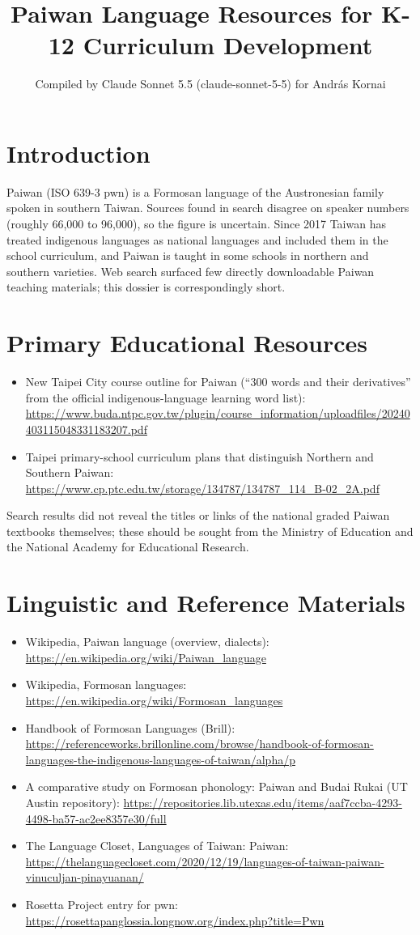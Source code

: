 \documentclass[12pt]{article}
\title{Paiwan Language Resources for K-12 Curriculum Development}
\author{Compiled by Claude Sonnet 5.5 (claude-sonnet-5-5) for Andr\'as Kornai}
\date{}
\begin{document}
\maketitle

\section{Introduction}
Paiwan (ISO 639-3 pwn) is a Formosan language of the Austronesian family spoken in southern Taiwan. Sources found in search disagree on speaker numbers (roughly 66,000 to 96,000), so the figure is uncertain. Since 2017 Taiwan has treated indigenous languages as national languages and included them in the school curriculum, and Paiwan is taught in some schools in northern and southern varieties. Web search surfaced few directly downloadable Paiwan teaching materials; this dossier is correspondingly short.

\section{Primary Educational Resources}
\begin{itemize}
\item New Taipei City course outline for Paiwan (``300 words and their derivatives'' from the official indigenous-language learning word list): \url{https://www.buda.ntpc.gov.tw/plugin/course_information/uploadfiles/20240403115048331183207.pdf}
\item Taipei primary-school curriculum plans that distinguish Northern and Southern Paiwan: \url{https://www.cp.ptc.edu.tw/storage/134787/134787_114_B-02_2A.pdf}
\end{itemize}
Search results did not reveal the titles or links of the national graded Paiwan textbooks themselves; these should be sought from the Ministry of Education and the National Academy for Educational Research.

\section{Linguistic and Reference Materials}
\begin{itemize}
\item Wikipedia, Paiwan language (overview, dialects): \url{https://en.wikipedia.org/wiki/Paiwan_language}
\item Wikipedia, Formosan languages: \url{https://en.wikipedia.org/wiki/Formosan_languages}
\item Handbook of Formosan Languages (Brill): \url{https://referenceworks.brillonline.com/browse/handbook-of-formosan-languages-the-indigenous-languages-of-taiwan/alpha/p}
\item A comparative study on Formosan phonology: Paiwan and Budai Rukai (UT Austin repository): \url{https://repositories.lib.utexas.edu/items/aaf7ccba-4293-4498-ba57-ac2ee8357e30/full}
\item The Language Closet, Languages of Taiwan: Paiwan: \url{https://thelanguagecloset.com/2020/12/19/languages-of-taiwan-paiwan-vinuculjan-pinayuanan/}
\item Rosetta Project entry for pwn: \url{https://rosettapanglossia.longnow.org/index.php?title=Pwn}
\end{itemize}
\end{document}
